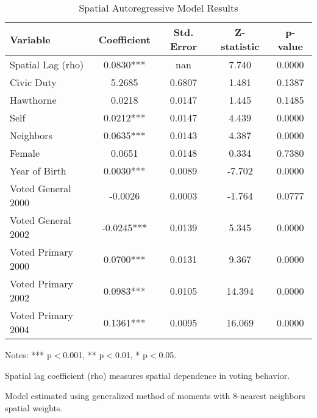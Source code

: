 \begin{table}[H]
\caption{Spatial Autoregressive Model Results}
\label{tab:sar_results}
\begin{center}
\begin{tabular}{lcccc}
\toprule
Variable & Coefficient & Std. Error & Z-statistic & p-value \\
\midrule
Spatial Lag (rho) & 0.0830*** & nan & 7.740 & 0.0000 \\
Civic Duty & 5.2685 & 0.6807 & 1.481 & 0.1387 \\
Hawthorne & 0.0218 & 0.0147 & 1.445 & 0.1485 \\
Self & 0.0212*** & 0.0147 & 4.439 & 0.0000 \\
Neighbors & 0.0635*** & 0.0143 & 4.387 & 0.0000 \\
Female & 0.0651 & 0.0148 & 0.334 & 0.7380 \\
Year of Birth & 0.0030*** & 0.0089 & -7.702 & 0.0000 \\
Voted General 2000 & -0.0026 & 0.0003 & -1.764 & 0.0777 \\
Voted General 2002 & -0.0245*** & 0.0139 & 5.345 & 0.0000 \\
Voted Primary 2000 & 0.0700*** & 0.0131 & 9.367 & 0.0000 \\
Voted Primary 2002 & 0.0983*** & 0.0105 & 14.394 & 0.0000 \\
Voted Primary 2004 & 0.1361*** & 0.0095 & 16.069 & 0.0000 \\
\bottomrule
\end{tabular}
\begin{tablenotes}
\small
\item Notes: *** p$<$0.001, ** p$<$0.01, * p$<$0.05.
\item Spatial lag coefficient (rho) measures spatial dependence in voting behavior.
\item Model estimated using generalized method of moments with 8-nearest neighbors spatial weights.
\end{tablenotes}
\end{center}
\end{table}
